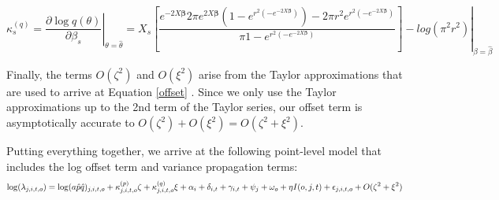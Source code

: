 \documentclass[12pt]{article}
\begin{document}

\begin{equation*}\label{kappa_q}
	\kappa_{s}^{(q)} = \left. \dfrac{\partial \log q(\theta)}{\partial \beta_s} \right\vert_{\theta = \hat{\theta}}= \left. X_s \left[\dfrac{{e^{-2X\boldsymbol{\beta}}} {2 \pi  e^{2X\boldsymbol{\beta}}} {\left(1 - e^{r^2 \left(-e^{-2X\boldsymbol{\beta}}\right)}\right)} - {2\pi r^2} {e^{r^2 \left(-e^{-2X\boldsymbol{\beta}}\right)}}}             {\pi {1-e^{r^2 \left(-e^{-2X\boldsymbol{\beta}}\right)}}}\right]  - log(\pi^2r^2) \right\vert_{\beta = \hat{\beta}}
\end{equation*}

Finally, the terms $O(\zeta^2)$ and $O(\xi^2)$ arise from the Taylor approximations that are used to arrive at Equation \ref{offset} \citep{bravington_variance_2021}. Since we only use the Taylor approximations up to the 2nd term of the Taylor series, our offset term is asymptotically accurate to $O(\zeta^2) + O(\xi^2) = O(\zeta^2 + \xi^2)$.

Putting everything together, we arrive at the following point-level model that includes the log offset term and variance propagation terms:
\begin{equation}\label{bbs_varprop}
	\log(\lambda_{j,i,t,o}) = \log(a \hat{p} \hat{q})_{j,i,t,o} + \kappa_{j,i,t,o}^{(p)}\zeta + \kappa_{j,i,t,o}^{(q)}\xi + \alpha_i + \delta_{i,t} + \gamma_{i,t} + \psi_j + \omega_o + \eta I(o,j,t) + \epsilon_{j,i,t,o} + O(\zeta^2 + \xi^2) \\
\end{equation}




	
\end{document}
